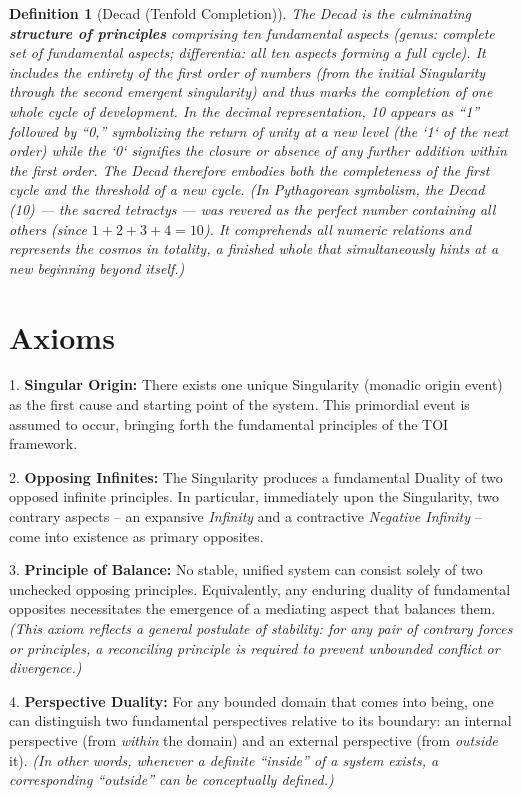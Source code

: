 \documentclass[11pt]{article}
\newtheorem{definition}{Definition}
\theoremstyle{plain}
\begin{document}
\begin{definition}[Decad (Tenfold Completion)]
The \emph{Decad} is the culminating \textbf{structure of principles} comprising ten fundamental aspects \textit{(genus: complete set of fundamental aspects; differentia: all ten aspects forming a full cycle)}. It includes the entirety of the first order of numbers (from the initial Singularity through the second emergent singularity) and thus marks the completion of one whole cycle of development. In the decimal representation, 10 appears as “1” followed by “0,” symbolizing the return of unity at a new level (the `1` of the next order) while the `0` signifies the closure or absence of any further addition within the first order. The Decad therefore embodies both the completeness of the first cycle and the threshold of a new cycle. \textit{(In Pythagorean symbolism, the Decad (10) — the sacred tetractys — was revered as the perfect number containing all others (since $1+2+3+4=10$). It comprehends all numeric relations and represents the cosmos in totality, a finished whole that simultaneously hints at a new beginning beyond itself.)}
\end{definition}

\section{Axioms}

1. \textbf{Singular Origin:} There exists one unique Singularity (monadic origin event) as the first cause and starting point of the system. This primordial event is assumed to occur, bringing forth the fundamental principles of the TOI framework.

2. \textbf{Opposing Infinites:} The Singularity produces a fundamental Duality of two opposed infinite principles. In particular, immediately upon the Singularity, two contrary aspects – an expansive \textit{Infinity} and a contractive \textit{Negative Infinity} – come into existence as primary opposites.

3. \textbf{Principle of Balance:} No stable, unified system can consist solely of two unchecked opposing principles. Equivalently, any enduring duality of fundamental opposites necessitates the emergence of a mediating aspect that balances them. \textit{(This axiom reflects a general postulate of stability: for any pair of contrary forces or principles, a reconciling principle is required to prevent unbounded conflict or divergence.)}

4. \textbf{Perspective Duality:} For any bounded domain that comes into being, one can distinguish two fundamental perspectives relative to its boundary: an internal perspective (from \textit{within} the domain) and an external perspective (from \textit{outside} it). \textit{(In other words, whenever a definite “inside” of a system exists, a corresponding “outside” can be conceptually defined.)}
\end{document}
